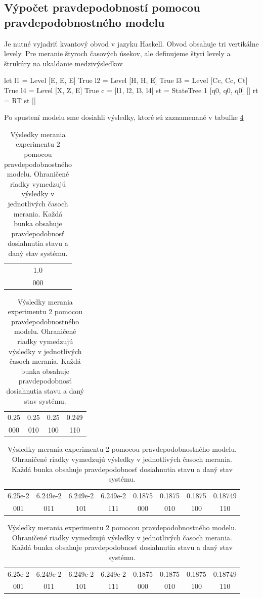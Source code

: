 \subsection*{Výpočet pravdepodobností pomocou pravdepodobnostného modelu}
Je nutné vyjadriť kvantový obvod v jazyku Haskell. Obvod obsahuje tri 
vertikálne levely. Pre meranie štyroch časových úsekov, ale definujeme 
štyri levely a štrukúry na ukaldanie medzivýsledkov
\begin{code}
let l1 = Level [E, E, E] True
    l2 = Level [H, H, E] True
    l3 = Level [Cc, Cc, Ct] True
    l4 = Level [X, Z, E] True
    c = [l1, l2, l3, l4]
    st = StateTree 1 [q0, q0, q0] []
    rt = RT st []
\end{code}

Po spustení modelu sme dosiahli výsledky, ktoré sú zaznamenané v tabuľke
\ref{expr2_results}

\begin{table}
\centering
\begin{tabular}{|c|}
\hline
1.0 \\ 
000 \\ 
\hline
\end{tabular}

\begin{tabular}{|c|c|c|c|}
\hline
0.25 & 0.25 & 0.25 & 0.249 \\ 
000 & 010 & 100 & 110 \\ 
\hline
\end{tabular}

\begin{tabular}{|c|c|c|c|c|c|c|c|}
\hline
6.25e-2 & 6.249e-2 & 6.249e-2 & 6.249e-2 & 0.1875 & 0.1875 & 0.1875 & 0.18749 \\ 
001 & 011 & 101 & 111 & 000 & 010 & 100 & 110 \\ 
\hline
\end{tabular}

\begin{tabular}{|c|c|c|c|c|c|c|c|}
\hline
6.25e-2 & 6.249e-2 & 6.249e-2 & 6.249e-2 & 0.1875 & 0.1875 & 0.1875 & 0.18749 \\ 
001 & 011 & 101 & 111 & 000 & 010 & 100 & 110 \\ 
\hline
\end{tabular}

\caption{\label{expr2_results} Výsledky merania experimentu 2 pomocou
pravdepodobnostného modelu. Ohraničené riadky vymedzujú výsledky v jednotlivých
 časoch merania. Každá bunka obsahuje pravdepodobnosť dosiahnutia stavu a 
daný stav systému.}
\end{table}

